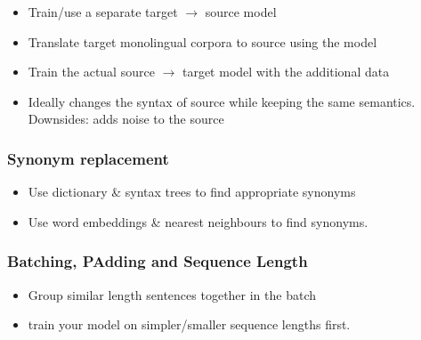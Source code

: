 \documentclass[11pt]{article}
\begin{document}
\begin{itemize}
    \item Train/use a separate target $\rightarrow$ source model
    \item Translate target monolingual corpora to source using the model
    \item Train the actual source $\rightarrow$ target model with the additional data
    \item Ideally changes the syntax of source while keeping the same semantics. Downsides: adds noise to the source
\end{itemize}


\subsubsection{Synonym replacement}

\begin{itemize}
    \item Use dictionary \& syntax trees to find appropriate synonyms
    \item Use word embeddings \& nearest neighbours to find synonyms.
\end{itemize}

\subsubsection{Batching, PAdding and Sequence Length}

\begin{itemize}
    \item Group similar length sentences together in the batch
    \item train your model on simpler/smaller sequence lengths first.
\end{itemize}
\end{document}
